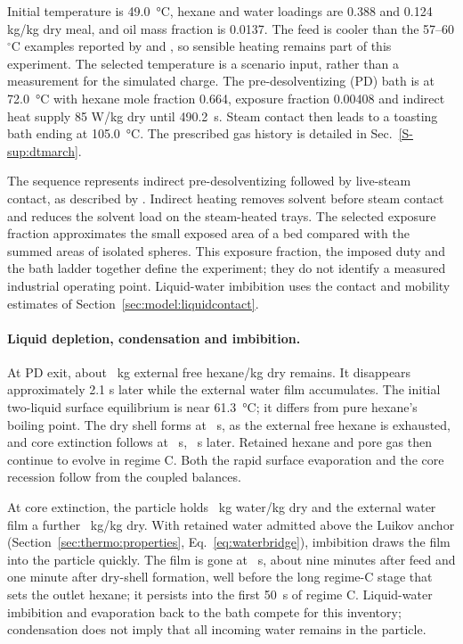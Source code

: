 Initial temperature is \SI{49.0}{\celsius}, hexane and water loadings are
0.388 and 0.124 kg/kg dry meal, and oil mass fraction is 0.0137.
The feed is cooler than the 57--60$^\circ$C examples reported by
\citet{witte_nd_soybeanmeal} and \citet{kemper2013solvent}, so sensible
heating remains part of this experiment. The selected temperature is a
scenario input, rather than a measurement for the simulated charge.
The pre-desolventizing (PD) bath is at \SI{72.0}{\celsius} with hexane mole
fraction 0.664, exposure fraction 0.00408 and indirect heat supply
85 W/kg dry until \SI{490.2}{\second}. Steam contact then leads to a
toasting bath ending at \SI{105.0}{\celsius}. The prescribed gas history
is detailed in Sec.~\ref*{S-sup:dtmarch}.

The sequence represents indirect pre-desolventizing followed by live-steam
contact, as described by \citet{kemper2013solvent}. Indirect heating removes
solvent before steam contact and reduces the solvent load on the
steam-heated trays. The selected exposure fraction approximates the small
exposed area of a bed compared with the summed areas of isolated spheres.
This exposure fraction, the imposed duty and the bath ladder together
define the experiment; they do not identify a measured industrial
operating point.
Liquid-water imbibition uses the contact and mobility estimates of
Section~\ref{sec:model:liquidcontact}.

\paragraph{Liquid depletion, condensation and imbibition.}
At PD exit, about \DTPDFreeHexane\ kg external free hexane/kg dry remains. It disappears
approximately 2.1 s later while the external water film accumulates.
The initial two-liquid surface equilibrium is near \SI{61.3}{\celsius};
it differs from pure hexane's boiling point. The dry shell forms at
\DTDryShell~s, as the external free hexane is exhausted, and core
extinction follows at \DTCoreExtinction~s, \DTShellToExtinction~s later. Retained hexane and pore gas then
continue to evolve in regime C. Both the rapid surface evaporation and the
core recession follow from the coupled balances.

At core extinction, the particle holds \DTExtinctionWater\ kg water/kg dry
and the external water film a further \DTExtinctionFilm\ kg/kg dry. With
retained water admitted above the Luikov anchor
(Section~\ref{sec:thermo:properties}, Eq.~\eqref{eq:waterbridge}), imbibition draws the film into the
particle quickly. The film is gone at \DTFilmDepletion~s, about nine
minutes after feed and one minute after dry-shell formation, well before
the long regime-C stage that sets the outlet hexane; it persists into the
first 50~s of regime C. Liquid-water imbibition and evaporation back to the
bath compete for this inventory; condensation does not imply that all
incoming water remains in the particle.

